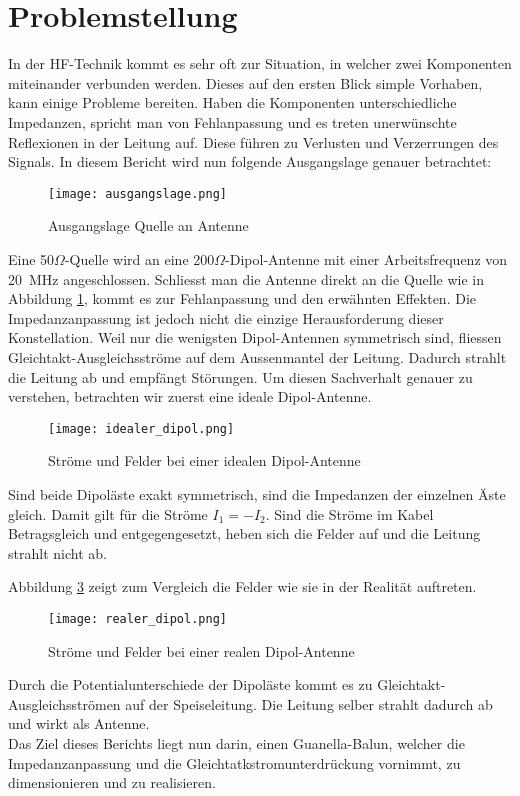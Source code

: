 \section{Problemstellung}
In der HF-Technik kommt es sehr oft zur Situation, in welcher zwei Komponenten miteinander verbunden werden. Dieses auf den ersten Blick simple Vorhaben, kann einige Probleme bereiten. Haben die Komponenten unterschiedliche Impedanzen, spricht man von Fehlanpassung und es treten unerwünschte Reflexionen in der Leitung auf. Diese führen zu Verlusten und Verzerrungen des Signals. In diesem Bericht wird nun folgende Ausgangslage genauer betrachtet:
\begin{figure}[h]
	\centering
	\texttt{[image: ausgangslage.png]}
	\caption{Ausgangslage Quelle an Antenne}\label{fig:ausgangslage}
\end{figure}

Eine 50$\Omega$-Quelle wird an eine 200$\Omega$-Dipol-Antenne mit einer Arbeitsfrequenz von \SI{20}{MHz} angeschlossen. Schliesst man die Antenne direkt an die Quelle wie in Abbildung \ref{fig:ausgangslage}, kommt es zur Fehlanpassung und den erwähnten Effekten. Die Impedanzanpassung ist jedoch nicht die einzige Herausforderung dieser Konstellation.
\newline
Weil nur die wenigsten Dipol-Antennen symmetrisch sind, fliessen Gleichtakt-Ausgleichsströme auf dem Aussenmantel der Leitung. Dadurch strahlt die Leitung ab und empfängt Störungen. Um diesen Sachverhalt genauer zu verstehen, betrachten wir zuerst eine ideale Dipol-Antenne.

\begin{figure}[H]
	\centering
	\texttt{[image: idealer\_dipol.png]}
	\caption{Ströme und Felder bei einer idealen Dipol-Antenne}\label{fig:idealer_dipol}
\end{figure}

Sind beide Dipoläste exakt symmetrisch, sind die Impedanzen der einzelnen Äste gleich. Damit gilt für die Ströme $I_{1}=-I_{2}$. Sind die Ströme im Kabel Betragsgleich und entgegengesetzt, heben sich die Felder auf und die Leitung strahlt nicht ab.

Abbildung \ref{fig:realer_dipol} zeigt zum Vergleich die Felder wie sie in der Realität auftreten.
\begin{figure}[H]
	\centering
	\texttt{[image: realer\_dipol.png]}
	\caption{Ströme und Felder bei einer realen Dipol-Antenne}\label{fig:realer_dipol}
\end{figure}

Durch die Potentialunterschiede der Dipoläste kommt es zu Gleichtakt-Ausgleichsströmen auf der Speiseleitung. Die Leitung selber strahlt dadurch ab und wirkt als Antenne. \\

Das Ziel dieses Berichts liegt nun darin, einen Guanella-Balun, welcher die Impedanzanpassung und die Gleichtatkstromunterdrückung vornimmt, zu dimensionieren und zu realisieren. \cite{balun_work}